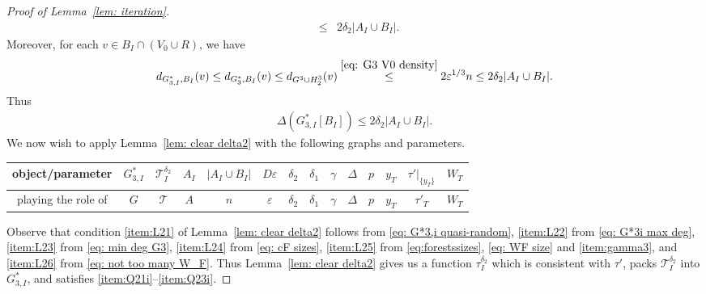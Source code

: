 \documentclass[a4paper, 11pt, reqno]{amsart}
\numberwithin{equation}{section}
\newcommand{\1}{{\rm 1\hspace*{-0.4ex}%
\rule{0.1ex}{1.52ex}\hspace*{0.2ex}}}
\newcommand{\cT}{\mathcal{T}}
\newcommand{\I}{I}
\newcommand{\sT}{\mathscr{T}}
\renewcommand{\epsilon}{\varepsilon}
\begin{document}
\begin{proof}[Proof of Lemma~\ref{lem: iteration}]
\begin{eqnarray*}
&\leq& 2\delta_2 |A_{\I}\cup B_{\I}|.
\end{eqnarray*}
Moreover, for each $v\in B_{\I}\cap(V_0\cup R)$, we have
\begin{eqnarray*}
d_{G^*_{3,{\I}},B_{\I}}(v) 
\leq d_{G^*_{3},B_{\I}}(v)
\leq d_{G^3\cup H^3_2}(v)
\stackrel{ \eqref{eq: G3 V0 density} }{\leq} 2\epsilon^{1/3} n 
\leq 2\delta_2|A_{\I}\cup B_{\I}|.
\end{eqnarray*}
Thus 
\begin{align}\label{eq: G*3i max deg}
\Delta(G^*_{3,{\I}}[B_{\I}])\leq 2\delta_2|A_{\I}\cup B_{\I}|.
\end{align}
We now wish to apply Lemma~\ref{lem: clear delta2} with the following graphs and parameters. \newline

\noindent
{
\begin{tabular}{c|c|c|c|c|c|c|c|c|c|c|c|c|c}
object/parameter & $G^*_{3,{\I}}$ & $\sT^{\delta_2}_{\I}$ & $A_{\I}$ & $|A_{\I}\cup B_{\I}|$ &$D\epsilon$ &$\delta_2$ & $\delta_1$ &  $\gamma$ &  $\Delta$   &  $p$ & $y_{T}$ & $\tau'|_{\{y_T\}}$ 
& $W_{T}$\\ \hline
playing the role of & $G$ & $\cT$ & $A$ & $n$ & $\epsilon$ & $\delta_2$ & $\delta_1$ &  $\gamma$ &  $\Delta$  & $p $ & $y_{T}$ & $\tau'_{T}$ & $ W_T$
\end{tabular}
}\newline \vspace{0.2cm}

\noindent
Observe that condition \ref{item:L21} of Lemma~\ref{lem: clear delta2} follows from \eqref{eq: G*3,i quasi-random},
\ref{item:L22} from \eqref{eq: G*3i max deg},
\ref{item:L23} from \eqref{eq: min deg G3},
\ref{item:L24} from \eqref{eq: cF sizes},
\ref{item:L25} from \eqref{eq:forestssizes}, \eqref{eq: WF size} and \ref{item:gamma3}, and
\ref{item:L26} from \eqref{eq: not too many W_F}. Thus Lemma~\ref{lem: clear delta2} gives us a function $\tau^{\delta_2}_{\I}$ which is consistent with $\tau'$,
packs $\sT_\I^{\delta_2}$ into $G_{3,{\I}}^*$, and satisfies \ref{item:Q21i}--\ref{item:Q23i}.


\end{proof}
\end{document}
